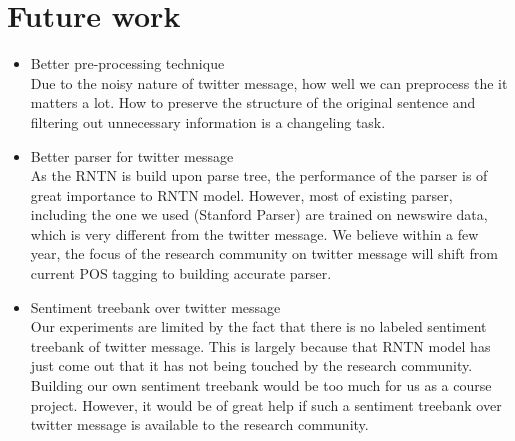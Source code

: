 \section{Future work}
\label{sec:future}
\begin{itemize}
\addtolength{\itemsep}{-0.5\baselineskip}

\item Better pre-processing technique \\
Due to the noisy nature of twitter message, how well we can preprocess the it matters a lot. How to preserve the structure of the original sentence and filtering out unnecessary information is a changeling task. 

\item Better parser for twitter message \\
As the RNTN is build upon parse tree, the performance of the parser is of great importance to RNTN model. However, most of existing parser, including the one we used (Stanford Parser) are trained on newswire data, which is very different from the twitter message. We believe within a few year, the focus of the research community on twitter message will shift from current POS tagging to building accurate parser. 

\item Sentiment treebank over twitter message \\
Our experiments are limited by the fact that there is no labeled sentiment treebank of twitter message. This is largely because that RNTN model has just come out that it has not being touched by the research community. Building our own sentiment treebank would be too much for us as a course project. However, it would be of great help if such a sentiment treebank over twitter message is available to the research community. 


\end{itemize}


